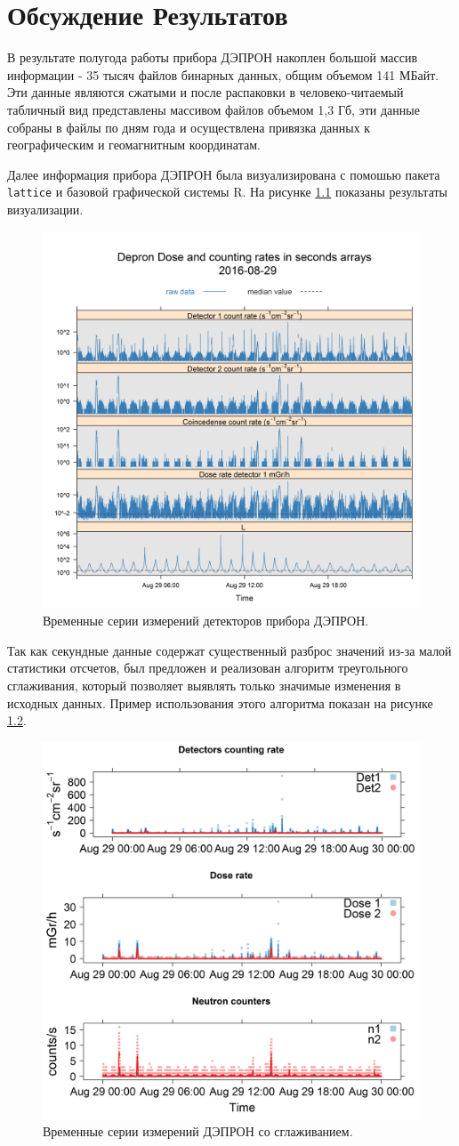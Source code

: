
\chapter{Обсуждение Результатов}\label{chapt_results}
В результате полугода работы прибора ДЭПРОН накоплен большой массив информации - 35 тысяч файлов бинарных данных, общим объемом 141 МБайт. Эти данные являются сжатыми и после распаковки в человеко-читаемый табличный вид представлены массивом файлов объемом 1,3 Гб, эти данные собраны в файлы по дням года и осуществлена привязка данных к географическим и геомагнитным координатам.



Далее информация прибора ДЭПРОН была визуализирована с помошью пакета \texttt{lattice} и базовой графической системы R. На рисунке \ref{fig:depronseclog08-29-16} показаны результаты визуализации.
\begin{figure}[h]
	\centering
	\includegraphics[width=0.5\linewidth]{images/results/depron_sec_log08-29-16}
	\caption{Временные серии  измерений детекторов прибора ДЭПРОН. }
	\label{fig:depronseclog08-29-16}
\end{figure}
Так как секундные данные содержат существенный разброс значений из-за малой статистики отсчетов, был предложен и реализован алгоритм треугольного сглаживания, который позволяет выявлять только значимые изменения в исходных данных. Пример использования этого алгоритма показан на рисунке 	\ref{fig:depronseclognew08-29-16}.
\begin{figure}
	\centering
	\includegraphics[width=0.5\linewidth]{images/results/depron_sec_log_new08-29-16}
	\caption{Временные серии измерений ДЭПРОН со сглаживанием. }
	\label{fig:depronseclognew08-29-16}
\end{figure}
